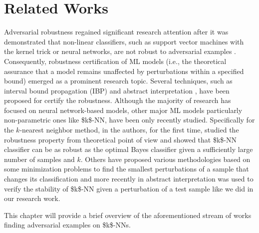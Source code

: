 
\chapter{Related Works}
\label{chp:related-works}

Adversarial robustness regained significant research attention after it was demonstrated that non-linear classifiers, such as support vector machines with the kernel trick or neural networks, are not robust to adversarial examples \cite{biggio2013, biggio_2013, szegedy2014}. Consequently, robustness certification of \acs{ML} models (i.e., the theoretical assurance that a model remains unaffected by perturbations within a specified bound) emerged as a prominent research topic. Several techniques, such as interval bound propagation (IBP) \cite{gowal2019, zhang2019} and abstract interpretation \cite{RanzatoUZ21, ferrara, vechev-sp18, vechev-icml18, MullerS0PV21, RZ19, RZ20, RanzatoZgecco21, vechev-nips18, singh2019, SinghGPV-iclr19, Survey}, have been proposed for certify the robustness. Although the majority of research has focused on neural network-based models, other major \acs{ML} models particularly non-parametric ones like \acs{$k$-NN}, have been only recently studied. Specifically for the $k$-nearest neighbor method, in \cite{WangJC18} the authors, for the first time, studied the robustness property from theoretical point of view and showed that \acs{$k$-NN} classifier can be as robust as the optimal Bayes classifier given a sufficiently large number of samples and $k$. Others have proposed various methodologies based on some minimization problems to find the smallest perturbations of a sample that changes its classification \cite{Wang19, YangRWC20, SitawarinW19, SitawarinW20, SitawarinKSW21} and more recently in \cite{Nicolo-knn} abstract interpretation was used to verify the stability of \acs{$k$-NN} given a perturbation of a test sample like we did in our research work.

This chapter will provide a brief overview of the aforementioned stream of works finding adversarial examples on \acsp{$k$-NN}.

